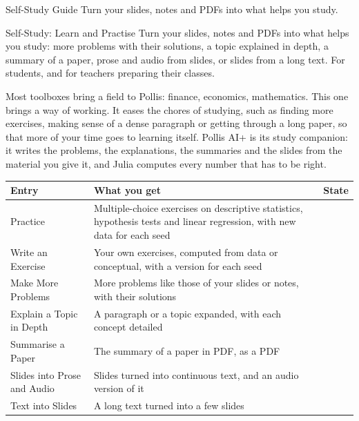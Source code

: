 
\renewcommand{\vignetteauthor}{Pollis}
\renewcommand{\vignettedate}{4 November 2026}
\renewcommand{\vignettelicense}{AGPL-3.0}

\newcommand{\ready}{\leavevmode{\color{agree}\bfseries\faCheck\enspace Ready}}
\newcommand{\soon}{\leavevmode{\color{deepamber}\bfseries\faHourglassHalf\enspace In preparation}}



  {Self-Study Guide}
  {Turn your slides, notes and PDFs into what helps you study.}

\begin{nbox}{Self-Study: Learn and Practise}
Turn your slides, notes and PDFs into what helps you study: more problems with their solutions, a topic
explained in depth, a summary of a paper, prose and audio from slides, or slides from a long text. For
students, and for teachers preparing their classes.
\end{nbox}

Most toolboxes bring a field to Pollis: finance, economics, mathematics. This one brings a way of working.
It eases the chores of studying, such as finding more exercises, making sense of a dense paragraph or
getting through a long paper, so that more of your time goes to learning itself. Pollis AI+ is its study companion:
it writes the problems, the explanations, the summaries and the slides from the material you give it, and
Julia computes every number that has to be right.

{\small
\begin{tabularx}{\linewidth}{@{}>{\raggedright\arraybackslash}p{44mm}X>{\raggedright\arraybackslash}p{27mm}@{}}
\toprule
\textbf{Entry} & \textbf{What you get} & \textbf{State} \\\midrule
Practice & Multiple-choice exercises on descriptive statistics, hypothesis tests and linear regression, with new data for each seed & \ready \\
Write an Exercise & Your own exercises, computed from data or conceptual, with a version for each seed & \ready \\
Make More Problems & More problems like those of your slides or notes, with their solutions & \soon \\
Explain a Topic in Depth & A paragraph or a topic expanded, with each concept detailed & \soon \\
Summarise a Paper & The summary of a paper in PDF, as a PDF & \soon \\
Slides into Prose and Audio & Slides turned into continuous text, and an audio version of it & \soon \\
Text into Slides & A long text turned into a few slides & \soon \\\bottomrule
\end{tabularx}}

